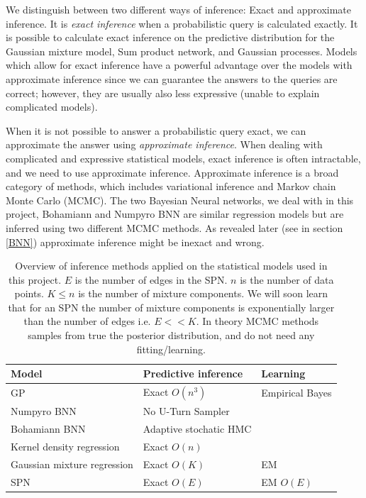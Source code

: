 We distinguish between two different ways of inference: Exact and approximate inference. It is
\textit{exact inference} when a probabilistic query is calculated exactly. It is possible to
calculate exact inference on the predictive distribution for the Gaussian mixture model, Sum product
network, and Gaussian processes. Models which allow for exact inference have a powerful advantage
over the models with approximate inference since we can guarantee the answers to the queries are
correct; however, they are usually also less expressive (unable to explain complicated models). 

When it is not possible to answer a probabilistic query exact, we can approximate the answer using
\textit{approximate inference}. When dealing with complicated and expressive statistical models,
exact inference is often intractable, and we need to use approximate inference. Approximate
inference is a broad category of methods, which includes variational inference and Markov chain
Monte Carlo (MCMC). The two Bayesian Neural networks, we deal with in this project, Bohamiann and
Numpyro BNN are similar regression models but are inferred using two different MCMC methods. As
revealed later (see in section \ref{BNN}) approximate inference might be inexact and wrong. 

\begin{table}[H]
    \centering
    \begin{tabular}{l|l|l}
    \textbf{Model}       & \textbf{Predictive inference}    &   \textbf{Learning} \\ \hline
    GP                          & Exact $O(n^3)$            & Empirical Bayes\\
    Numpyro BNN                 & No U-Turn Sampler         & \\
    Bohamiann BNN               & Adaptive stochatic HMC    & \\
    Kernel density regression   & Exact $O(n)$              & \\
    Gaussian mixture regression & Exact $O(K)$              & EM  \\
    SPN                         & Exact $O(E)$              &  EM $O(E)$\\
    \end{tabular}
    \caption{Overview of inference methods applied on the statistical models used in this project.
            $E$ is the number of edges in the SPN. $n$ is the number of data points. $K \leq n$ is
            the number of mixture components. We will soon learn that for an SPN the number of
            mixture components is exponentially larger than the number of edges i.e. $E << K$. In theory
            MCMC methods samples from true the posterior distribution, and do not need any
            fitting/learning. }
\end{table}

